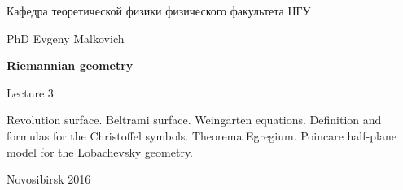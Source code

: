 \documentclass[12pt,pagesize,paper=192mm:108mm]{scrbook}
\begin{document}
\begin{titlepage}
\begin{center}
    Кафедра теоретической физики физического факультета НГУ
    \medskip

    \Large
    PhD Evgeny Malkovich

    \huge
    \textbf{Riemannian geometry}
    \smallskip

    \Large
    Lecture 3
    \vfill

    \normalsize
    \begin{minipage}{0.65\linewidth}
      Revolution surface. Beltrami surface. Weingarten
      equations. Definition and formulas for the Christoffel
      symbols. Theorema Egregium. Poincare half-plane model for the
      Lobachevsky geometry.
    \end{minipage}
    \vfill

    \normalsize \ccbysa\hspace{0.5em}  Novosibirsk 2016
  \end{center}
\end{titlepage}
\end{document}
